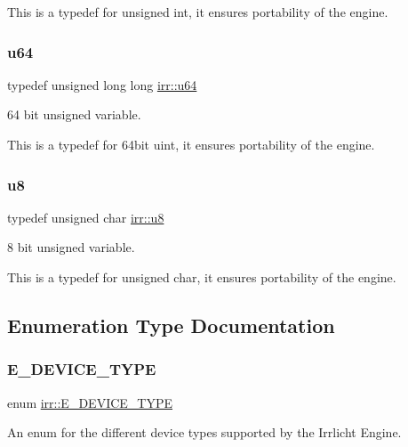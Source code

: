 This is a typedef for unsigned int, it ensures portability of the engine. \mbox{\label{namespaceirr_a9701cac11d289143453e212684075af7}} 
\subsubsection{\texorpdfstring{u64}{u64}}
{\footnotesize\ttfamily typedef unsigned long long \hyperlink{namespaceirr_a9701cac11d289143453e212684075af7}{irr\+::u64}}



64 bit unsigned variable. 

This is a typedef for 64bit uint, it ensures portability of the engine. \mbox{\label{namespaceirr_a646874f69af8ff87fc10201b0254a761}} 
\subsubsection{\texorpdfstring{u8}{u8}}
{\footnotesize\ttfamily typedef unsigned char \hyperlink{namespaceirr_a646874f69af8ff87fc10201b0254a761}{irr\+::u8}}



8 bit unsigned variable. 

This is a typedef for unsigned char, it ensures portability of the engine. 

\subsection{Enumeration Type Documentation}
\mbox{\label{namespaceirr_ac25d94cf2e1037c7ca18ee79b3bd4505}} 
\subsubsection{\texorpdfstring{E\+\_\+\+D\+E\+V\+I\+C\+E\+\_\+\+T\+Y\+PE}{E\_DEVICE\_TYPE}}
{\footnotesize\ttfamily enum \hyperlink{namespaceirr_ac25d94cf2e1037c7ca18ee79b3bd4505}{irr\+::\+E\+\_\+\+D\+E\+V\+I\+C\+E\+\_\+\+T\+Y\+PE}}



An enum for the different device types supported by the Irrlicht Engine. 

